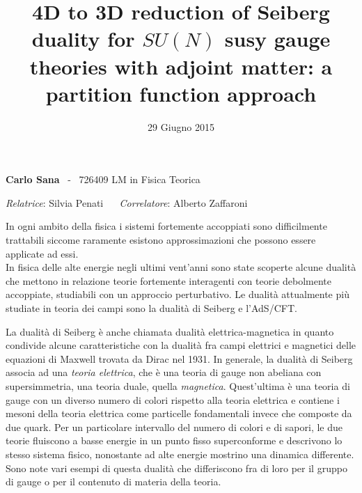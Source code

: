 \documentclass[a4paper,12pt]{article}
\title{\textbf{4D to 3D reduction of Seiberg duality for $SU(N)$ susy gauge theories with adjoint matter: a partition function approach }
\vspace{-0.5cm} }
\date{29 Giugno 2015}
\begin{document}
\maketitle
\vspace*{-1.5cm}
	 \textbf{Carlo Sana}  ~-~ 726409 
 \hfill
 LM in Fisica Teorica 
\\
\vspace{-0.5cm}
\begin{center}
\emph{Relatrice}: 
\textsf{Silvia Penati} 
~~
\emph{Correlatore}:
\textsf{Alberto Zaffaroni}

\end{center}

In ogni ambito della fisica i sistemi fortemente accoppiati sono difficilmente trattabili siccome raramente esistono approssimazioni che possono essere applicate ad essi.\\
In fisica delle alte energie negli ultimi vent'anni sono state scoperte alcune dualità che mettono in relazione teorie fortemente interagenti con teorie debolmente accoppiate, studiabili con un approccio perturbativo.
Le dualità attualmente più studiate in teoria dei campi sono la dualità di Seiberg e l'AdS/CFT.

La dualità di Seiberg è anche chiamata dualità elettrica-magnetica in quanto condivide alcune caratteristiche con la dualità fra campi elettrici e magnetici delle equazioni di Maxwell trovata da Dirac nel 1931. 
In generale, la dualità di Seiberg associa ad una \emph{teoria elettrica}, che è una teoria di gauge non abeliana con supersimmetria, una teoria duale, quella \emph{magnetica}.
Quest'ultima è una teoria di gauge con un diverso numero di colori rispetto alla teoria elettrica e contiene i mesoni della teoria elettrica come particelle fondamentali invece che composte da due quark.
Per un particolare intervallo del numero di colori e di sapori, le due teorie fluiscono a basse energie in un punto fisso superconforme e descrivono lo stesso sistema fisico, nonostante ad alte energie mostrino una dinamica differente.
Sono note vari esempi di questa dualità che differiscono fra di loro per il gruppo di gauge o per il contenuto di materia della teoria.
\end{document}
